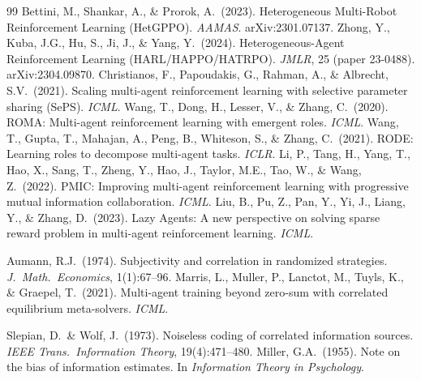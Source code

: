 \documentclass{article}
\begin{document}
\begin{thebibliography}{99}
 Bettini, M., Shankar, A., \& Prorok, A.\ (2023). Heterogeneous Multi-Robot Reinforcement Learning (HetGPPO). \emph{AAMAS}. arXiv:2301.07137.
 Zhong, Y., Kuba, J.G., Hu, S., Ji, J., \& Yang, Y.\ (2024). Heterogeneous-Agent Reinforcement Learning (HARL/HAPPO/HATRPO). \emph{JMLR}, 25 (paper 23-0488). arXiv:2304.09870.
 Christianos, F., Papoudakis, G., Rahman, A., \& Albrecht, S.V.\ (2021). Scaling multi-agent reinforcement learning with selective parameter sharing (SePS). \emph{ICML}.
 Wang, T., Dong, H., Lesser, V., \& Zhang, C.\ (2020). ROMA: Multi-agent reinforcement learning with emergent roles. \emph{ICML}.
 Wang, T., Gupta, T., Mahajan, A., Peng, B., Whiteson, S., \& Zhang, C.\ (2021). RODE: Learning roles to decompose multi-agent tasks. \emph{ICLR}.
 Li, P., Tang, H., Yang, T., Hao, X., Sang, T., Zheng, Y., Hao, J., Taylor, M.E., Tao, W., \& Wang, Z.\ (2022). PMIC: Improving multi-agent reinforcement learning with progressive mutual information collaboration. \emph{ICML}.
 Liu, B., Pu, Z., Pan, Y., Yi, J., Liang, Y., \& Zhang, D.\ (2023). Lazy Agents: A new perspective on solving sparse reward problem in multi-agent reinforcement learning. \emph{ICML}.

 Aumann, R.J.\ (1974). Subjectivity and correlation in randomized strategies. \emph{J.\ Math.\ Economics}, 1(1):67--96.
 Marris, L., Muller, P., Lanctot, M., Tuyls, K., \& Graepel, T.\ (2021). Multi-agent training beyond zero-sum with correlated equilibrium meta-solvers. \emph{ICML}.

 Slepian, D.\ \& Wolf, J.\ (1973). Noiseless coding of correlated information sources. \emph{IEEE Trans.\ Information Theory}, 19(4):471--480.
 Miller, G.A.\ (1955). Note on the bias of information estimates. In \emph{Information Theory in Psychology}.

\end{thebibliography}
\end{document}
